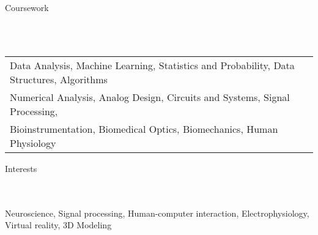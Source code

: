 \documentclass{article}
\newcommand{\lineunder} {
    \vspace*{-8pt} \\
    \hspace*{-18pt} \hrulefill \\
}
\newcommand{\header} [1] {
    {\hspace*{-18pt}\vspace*{6pt} \Large{#1} }
    \vspace*{-6pt} 
    \lineunder
}
\begin{document}
%
\vspace{5mm}
\header{Coursework}
\vspace{1mm}
\begin{tabular}{ l l }
	Data Analysis, Machine Learning, Statistics and Probability, Data Structures, Algorithms \\
	Numerical Analysis, Analog Design, Circuits and Systems, Signal Processing, \\
	Bioinstrumentation, Biomedical Optics, Biomechanics, Human Physiology
\end{tabular}
\vspace{5mm}

\header{Interests}
Neuroscience, Signal processing, Human-computer interaction, Electrophysiology, Virtual reality, 3D Modeling
\end{document}

